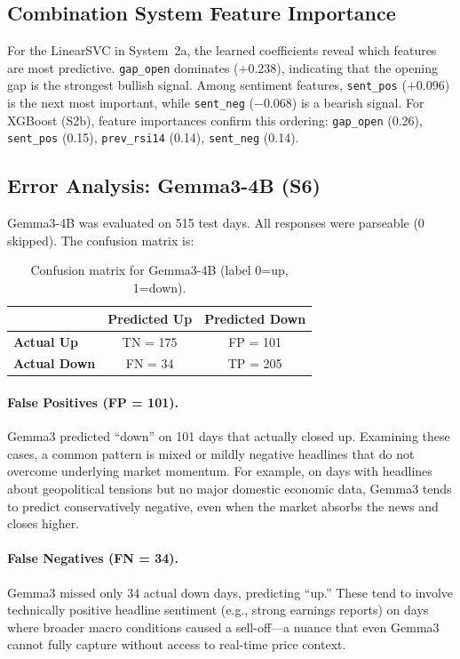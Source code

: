 \documentclass[11pt]{article}
\begin{document}
\subsection{Combination System Feature Importance}

For the LinearSVC in System~2a, the learned coefficients reveal which features are most predictive. \texttt{gap\_open} dominates ($+0.238$), indicating that the opening gap is the strongest bullish signal. Among sentiment features, \texttt{sent\_pos} ($+0.096$) is the next most important, while \texttt{sent\_neg} ($-0.068$) is a bearish signal. For XGBoost (S2b), feature importances confirm this ordering: \texttt{gap\_open} (0.26), \texttt{sent\_pos} (0.15), \texttt{prev\_rsi14} (0.14), \texttt{sent\_neg} (0.14).

\subsection{Error Analysis: Gemma3-4B (S6)}

Gemma3-4B was evaluated on 515 test days. All responses were parseable (0 skipped). The confusion matrix is:

\begin{table}[h]
\centering
\small
\begin{tabular}{lcc}
\toprule
 & \textbf{Predicted Up} & \textbf{Predicted Down} \\
\midrule
\textbf{Actual Up} & TN = 175 & FP = 101 \\
\textbf{Actual Down} & FN = 34 & TP = 205 \\
\bottomrule
\end{tabular}
\caption{Confusion matrix for Gemma3-4B (label 0=up, 1=down).}
\label{tab:cm}
\end{table}

\paragraph{False Positives (FP = 101).} Gemma3 predicted ``down'' on 101 days that actually closed up. Examining these cases, a common pattern is mixed or mildly negative headlines that do not overcome underlying market momentum. For example, on days with headlines about geopolitical tensions but no major domestic economic data, Gemma3 tends to predict conservatively negative, even when the market absorbs the news and closes higher.

\paragraph{False Negatives (FN = 34).} Gemma3 missed only 34 actual down days, predicting ``up.'' These tend to involve technically positive headline sentiment (e.g., strong earnings reports) on days where broader macro conditions caused a sell-off—a nuance that even Gemma3 cannot fully capture without access to real-time price context.
\end{document}
